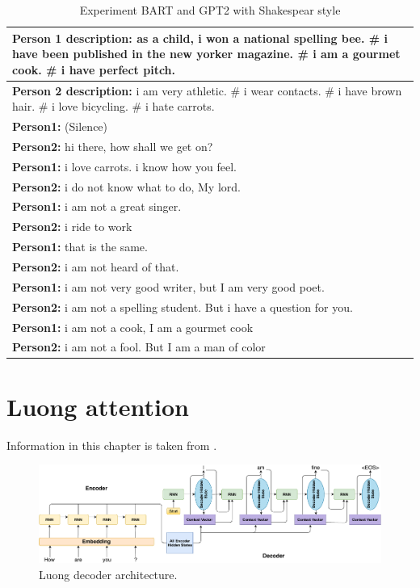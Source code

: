 \begin{table}[ht]
\centering
 \begin{tabular}{|p{14cm}|} 
 \hline\hline
 \textbf{Person 1 description:} as a child, i won a national spelling bee. \# i have been published in the new yorker magazine. \# i am a gourmet cook. \# i have perfect pitch. \\
 \hline
 \textbf{Person 2 description:} i am very athletic. \# i wear contacts. \# i have brown hair. \# i love bicycling. \# i hate carrots. \\
 \hline\hline
 \textbf{Person1:} (Silence) \\
 \textbf{Person2:} hi there, how shall we get on?  \\ 
 \textbf{Person1:} i love carrots. i know how you feel. \\
 \textbf{Person2:} i do not know what to do, My lord. \\
 \textbf{Person1:} i am not a great singer. \\
 \textbf{Person2:} i ride to work \\
 \textbf{Person1:} that is the same. \\
 \textbf{Person2:} i am not heard of that. \\
 \textbf{Person1:} i am not very good writer, but I am very good poet. \\
 \textbf{Person2:} i am not a spelling student. But i have a question for you. \\
 \textbf{Person1:} i am not a cook, I am a gourmet cook \\
 \textbf{Person2:} i am not a fool. But I am a man of color  \\
 \hline\hline
 \end{tabular}
 \caption{Experiment BART and GPT2 with Shakespear style}
\label{tab:poetic_shakespear}
\end{table}

\chapter{Luong attention} \label{luong_attn_appendix}

Information in this chapter is taken from \cite{luong2015effective}.
\begin{figure}[hbt]
  \centering
  \includegraphics[width=1\textwidth]{figures/luong_decoder.pdf}
  \caption{Luong decoder architecture.}
  \label{luong}
\end{figure}

